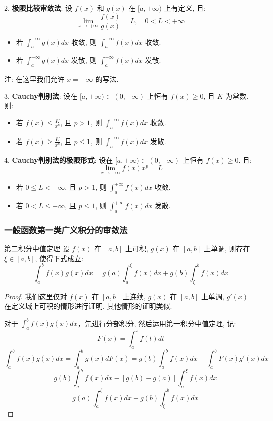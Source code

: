 \documentclass[a4paper,12pt]{ctexart}
\begin{document}
2. \textbf{极限比较审敛法}: 设 $f(x)$ 和 $g(x)$ 在 $[a,+\infty)$ 上有定义, 且:
$$
\lim_{x \to +\infty} \frac{f(x)}{g(x)} = L, \quad 0 < L < +\infty
$$
\begin{itemize}
    \item 若 $\int_a^{+\infty} g(x) dx$ 收敛, 则 $\int_a^{+\infty} f(x) dx$ 收敛.
    \item 若 $\int_a^{+\infty} g(x) dx$ 发散, 则 $\int_a^{+\infty} f(x) dx$ 发散.
\end{itemize}
注: 在这里我们允许 $x=+\infty$ 的写法.

3. \textbf{Cauchy判别法}: 设在 $[a, +\infty) \subset (0, +\infty)$ 上恒有 $f(x) \ge 0$, 且 $K$ 为常数. 则:
\begin{itemize}
    \item 若 $f(x) \leq \frac{K}{x^p}$, 且 $p>1$, 则 $\int_a^{+\infty} f(x) dx$ 收敛.
    \item 若 $f(x) \geq \frac{K}{x^p}$, 且 $p \leq 1$, 则 $\int_a^{+\infty} f(x) dx$ 发散.
\end{itemize}

4. \textbf{Cauchy判别法的极限形式}: 设在 $[a, +\infty) \subset (0, +\infty)$ 上恒有 $f(x) \ge 0$. 且:
$$
\lim_{x \to +\infty} f(x) x^p = L
$$
\begin{itemize}
    \item 若 $0 \leq L < +\infty$, 且 $p>1$, 则 $\int_a^{+\infty} f(x) dx$ 收敛.
    \item 若 $0 < L \leq +\infty$, 且 $p \leq 1$, 则 $\int_a^{+\infty} f(x) dx$ 发散.
\end{itemize}

\subsubsection{一般函数第一类广义积分的审敛法}

\begin{mylemma}{第二积分中值定理}{}
设 $f(x)$ 在 $[a,b]$ 上可积, $g(x)$ 在 $[a,b]$ 上单调, 则存在 $\xi \in [a,b]$, 使得下式成立:
$$
\int_a^b f(x)g(x) dx = g(a) \int_a^{\xi} f(x) dx + g(b) \int_{\xi}^b f(x) dx
$$
\end{mylemma}

\begin{proof}
我们这里仅对 $f(x)$ 在 $[a,b]$ 上连续, $g(x)$ 在 $[a,b]$ 上单调, $g'(x)$ 在定义域上可积的情形进行证明, 其他情形的证明类似.

对于 $\int_a^b f(x)g(x) dx$，先进行分部积分, 然后运用第一积分中值定理, 记:
$$F(x) = \int_a^x f(t) dt$$
$$\int_a^b f(x)g(x) dx = \int_a^b g(x) dF(x) = g(b)\int_a^bf(x)dx - \int_a^b F(x) g'(x) dx$$
$$= g(b)\int_a^bf(x)dx - [g(b)-g(a)]\int_a^{\xi} f(x) dx$$
$$= g(a)\int_a^{\xi} f(x) dx + g(b)\int_{\xi}^b f(x) dx$$
\end{proof}
\end{document}
